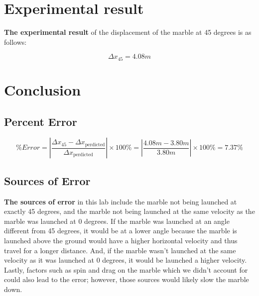 \documentclass{report}
\begin{document}
\section{Experimental result}

\textbf{The experimental result} of the displacement of the marble at 45 degrees is as follows:

$$ \Delta x_{45} = 4.08 m $$

\section{Conclusion}

\subsection{Percent Error}

$$ \% Error = |\frac{\Delta x_{45} - \Delta x_{\mathrm{perdicted}}}{\Delta x_{\mathrm{perdicted}}}| \times 100\% = |\frac{4.08m - 3.80m}{3.80m}| \times 100\% = 7.37\% $$

\subsection{Sources of Error}

\textbf{The sources of error} in this lab include the marble not being launched at exactly 45 degrees, and the marble not being launched at the same velocity as the marble was launched at 0 degrees. If the marble was launched at an angle different from 45 degrees, it would be at a lower angle because the marble is launched above the ground would have a higher horizontal velocity and thus travel for a longer distance. And, if the marble wasn't launched at the same velocity as it was launched at 0 degrees, it would be launched a higher velocity. Lastly, factors such as spin and drag on the marble which we didn't account for could also lead to the error; however, those sources would likely slow the marble down.
\end{document}
